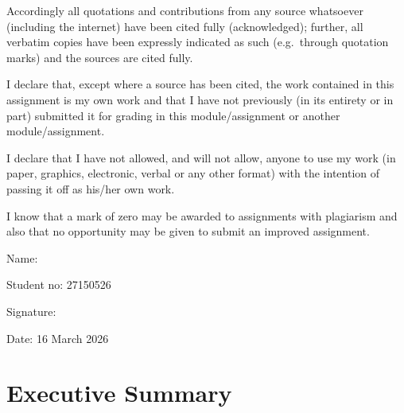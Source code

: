 \documentclass[12pt,a4paper]{report}
\newcommand{\studentnumber}{27150526}
\newcommand{\submissiondate}{16 March 2026}
\begin{document}
	Accordingly all quotations and contributions from any source whatsoever (including the internet) have been cited fully (acknowledged); further, all verbatim copies have been expressly indicated as such (e.g.\ through quotation marks) and the sources are cited fully.
	
	I declare that, except where a source has been cited, the work contained in this assignment is my own work and that I have not previously (in its entirety or in part) submitted it for grading in this module/assignment or another module/assignment.
	
	I declare that I have not allowed, and will not allow, anyone to use my work (in paper, graphics, electronic, verbal or any other format) with the intention of passing it off as his/her own work.
	
	I know that a mark of zero may be awarded to assignments with plagiarism and also that no opportunity may be given to submit an improved assignment.
	
	\vspace{1cm}
	
	Name: \author{}
	
	Student no: \studentnumber
	
	Signature: \hrulefill
	
	Date: \submissiondate
	
	\section*{\Large Executive Summary}
	
\end{document}
